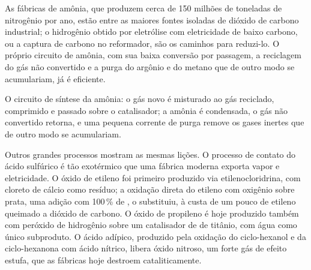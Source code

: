As fábricas de amônia, que produzem cerca de 150 milhões de toneladas de nitrogênio por ano, estão entre
as maiores fontes isoladas de dióxido de carbono industrial; o hidrogênio obtido por
eletrólise com eletricidade de baixo carbono, ou a captura de carbono no reformador,
são os caminhos para reduzi-lo. O próprio circuito de amônia, com sua baixa conversão
por passagem, a reciclagem do gás não convertido e a purga do argônio e do metano que
de outro modo se acumulariam, já é eficiente.

\begin{omfigure}

{\small O circuito de síntese da amônia: o gás novo é misturado ao gás reciclado,
comprimido e passado sobre o catalisador; a amônia é condensada, o gás não
convertido retorna, e uma pequena corrente de purga remove os gases inertes que
de outro modo se acumulariam.}
\end{omfigure}

Outros grandes processos mostram as mesmas lições. O processo de contato do ácido
sulfúrico é tão exotérmico que uma fábrica moderna exporta vapor e eletricidade.
O óxido de etileno foi primeiro produzido via etilenocloridrina, com cloreto de cálcio
como resíduo; a oxidação direta do etileno com oxigênio sobre prata, uma
adição com 100\,\% de , o substituiu, à custa de um pouco de etileno queimado a
dióxido de carbono. O óxido de propileno é hoje produzido também com peróxido de hidrogênio sobre um
catalisador de  de titânio, com água como único subproduto. O ácido adípico,
produzido pela oxidação do ciclo-hexanol e da ciclo-hexanona com ácido nítrico, libera
óxido nitroso, um forte gás de efeito estufa, que as fábricas hoje destroem cataliticamente.

